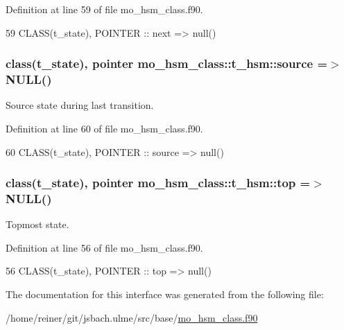 Definition at line 59 of file mo\+\_\+hsm\+\_\+class.\+f90.


\begin{DoxyCode}
59     \textcolor{keywordtype}{CLASS}(t\_state), \textcolor{keywordtype}{POINTER}     :: next    => null()  
\end{DoxyCode}
\hypertarget{structmo__hsm__class_1_1t__hsm_ac172a34a2cef6a45250c897f8c165e67}{}
\subsubsection[{source}]{\setlength{\rightskip}{0pt plus 5cm}class({\bf t\+\_\+state}), pointer mo\+\_\+hsm\+\_\+class\+::t\+\_\+hsm\+::source =$>$ N\+U\+L\+L()}\label{structmo__hsm__class_1_1t__hsm_ac172a34a2cef6a45250c897f8c165e67}


Source state during last transition. 



Definition at line 60 of file mo\+\_\+hsm\+\_\+class.\+f90.


\begin{DoxyCode}
60     \textcolor{keywordtype}{CLASS}(t\_state), \textcolor{keywordtype}{POINTER}     :: source  => null()  
\end{DoxyCode}
\hypertarget{structmo__hsm__class_1_1t__hsm_ac82b92ceb5581d9541a803ce0f618513}{}
\subsubsection[{top}]{\setlength{\rightskip}{0pt plus 5cm}class({\bf t\+\_\+state}), pointer mo\+\_\+hsm\+\_\+class\+::t\+\_\+hsm\+::top =$>$ N\+U\+L\+L()}\label{structmo__hsm__class_1_1t__hsm_ac82b92ceb5581d9541a803ce0f618513}


Topmost state. 



Definition at line 56 of file mo\+\_\+hsm\+\_\+class.\+f90.


\begin{DoxyCode}
56     \textcolor{keywordtype}{CLASS}(t\_state), \textcolor{keywordtype}{POINTER}     :: top     => null()  
\end{DoxyCode}


The documentation for this interface was generated from the following file\+:\begin{DoxyCompactItemize}
\item 
/home/reiner/git/jsbach.\+ulme/src/base/\hyperlink{mo__hsm__class_8f90}{mo\+\_\+hsm\+\_\+class.\+f90}\end{DoxyCompactItemize}
